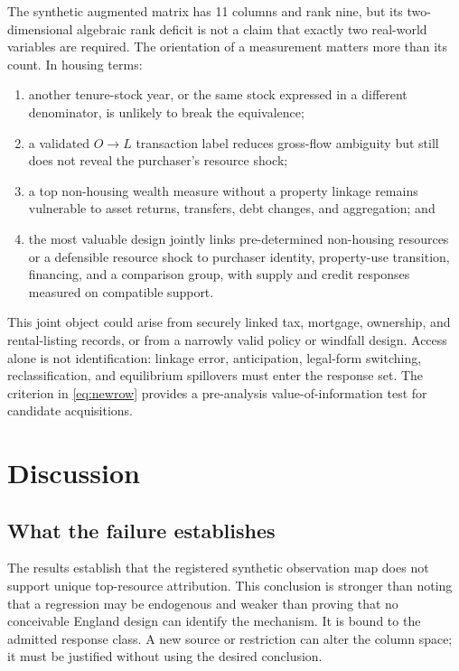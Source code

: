 \documentclass[11pt]{article}
\begin{document}
The synthetic augmented matrix has 11 columns and rank nine, but its two-
dimensional algebraic rank deficit is not a claim that exactly two real-world
variables are required. The orientation of a measurement matters more than its
count. In housing terms:
\begin{enumerate}
  \item another tenure-stock year, or the same stock expressed in a different
  denominator, is unlikely to break the equivalence;
  \item a validated $O\rightarrow L$ transaction label reduces gross-flow
  ambiguity but still does not reveal the purchaser's resource shock;
  \item a top non-housing wealth measure without a property linkage remains
  vulnerable to asset returns, transfers, debt changes, and aggregation; and
  \item the most valuable design jointly links pre-determined non-housing
  resources or a defensible resource shock to purchaser identity, property-use
  transition, financing, and a comparison group, with supply and credit responses
  measured on compatible support.
\end{enumerate}

This joint object could arise from securely linked tax, mortgage, ownership, and
rental-listing records, or from a narrowly valid policy or windfall design. Access
alone is not identification: linkage error, anticipation, legal-form switching,
reclassification, and equilibrium spillovers must enter the response set. The
criterion in \cref{eq:newrow} provides a pre-analysis value-of-information test for
candidate acquisitions.

\section{Discussion}
\label{sec:discussion}

\subsection{What the failure establishes}

The results establish that the registered synthetic observation map does not
support unique top-resource attribution. This conclusion is stronger than noting
that a regression may be endogenous and weaker than proving that no conceivable
England design can identify the mechanism. It is bound to the admitted response
class. A new source or restriction can alter the column space; it must be justified
without using the desired conclusion.
\end{document}
